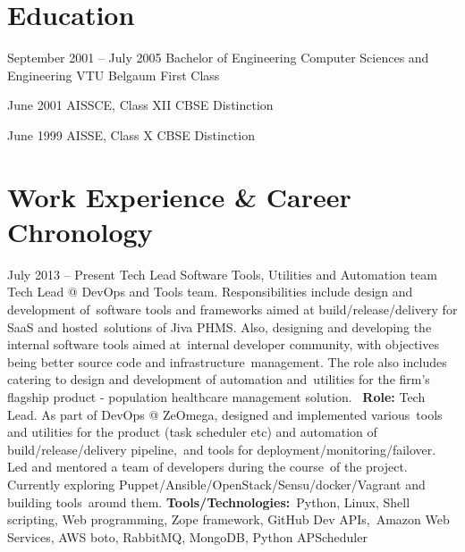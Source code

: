 \documentclass[11pt,a4paper,sans]{moderncv}
\begin{document}
\section{Education}

\cventry
{September 2001 -- July 2005}
{Bachelor of Engineering}
{Computer Sciences and Engineering}
{VTU Belgaum}
{First Class}
{} 

\cventry
{June 2001}
{AISSCE, Class XII}
{CBSE}
{Distinction}
{}
{} 

\cventry
{June 1999}
{AISSE, Class X}
{CBSE}
{Distinction}
{} 
{}

\section{Work Experience \& Career Chronology}

\cventry
{July 2013 -- Present}
{Tech Lead}
{Software Tools, Utilities and Automation team}
{}
{}
{Tech Lead @ DevOps and Tools team. Responsibilities include design and development of\
 software tools and frameworks aimed at build/release/delivery for SaaS and hosted\
 solutions of Jiva PHMS. Also, designing and developing the internal software tools aimed at\
 internal developer community, with objectives being better source code and infrastructure\
 management. The role also includes catering to design and development of automation and\
 utilities for the firm's flagship product - \hypersetup{linkcolor=blue} population healthcare management solution.\
\newline{}
\newline{}
\small {\textbf{Role:} Tech Lead. As part of DevOps @ ZeOmega, designed and implemented various\
	tools and utilities for the product	(task scheduler etc) and automation of build/release/delivery pipeline,\
	and tools for deployment/monitoring/failover.	Led and mentored a team of developers during the course\
	of the project. Currently exploring Puppet/Ansible/OpenStack/Sensu/docker/Vagrant and building tools\
	around them.
}
\newline{}
\small {\textbf{Tools/Technologies:}\
Python, Linux, Shell scripting, Web programming, Zope framework, GitHub Dev APIs,\
Amazon Web Services, AWS boto, RabbitMQ, MongoDB, Python APScheduler} 
\newline{}
}
\end{document}
